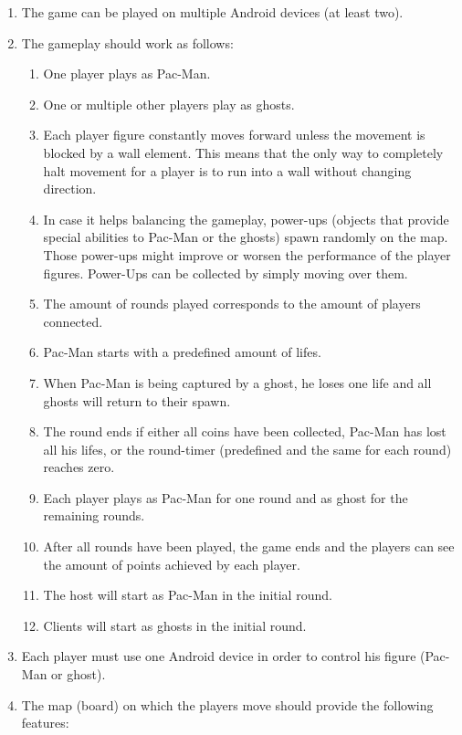\documentclass{report}
\begin{document}

\begin{enumerate}
	\item The game can be played on multiple Android devices (at least two).
	\item The gameplay should work as follows:
	\begin{enumerate}
		\item One player plays as Pac-Man.
		\item One or multiple other players play as ghosts.
		\item Each player figure constantly moves forward unless the movement is blocked by a wall element. This means that the only way to completely halt movement for a player is to run into a wall without changing direction.
		\item In case it helps balancing the gameplay, power-ups (objects that provide special abilities to Pac-Man or the ghosts) spawn randomly on the map. Those power-ups might improve or worsen the performance of the player figures. Power-Ups can be collected by simply moving over them.
		\item The amount of rounds played corresponds to the amount of players connected.
		\item Pac-Man starts with a predefined amount of lifes.
		\item When Pac-Man is being captured by a ghost, he loses one life and all ghosts will return to their spawn.
		\item The round ends if either all coins have been collected, Pac-Man has lost all his lifes, or the round-timer (predefined and the same for each round) reaches zero.
		\item Each player plays as Pac-Man for one round and as ghost for the remaining rounds.
		\item After all rounds have been played, the game ends and the players can see the amount of points achieved by each player.
		\item The host will start as Pac-Man in the initial round.
		\item Clients will start as ghosts in the initial round.
	\end{enumerate}
	\item Each player must use one Android device in order to control his figure (Pac-Man or ghost).
	\item The map (board) on which the players move should provide the following features:

\end{enumerate}
\end{document}
